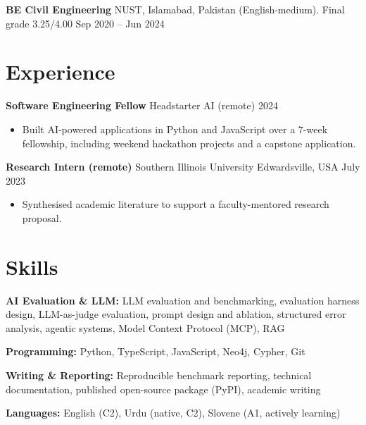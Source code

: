 \documentclass[a4paper,10.5pt]{article}
\newcommand{\datefill}{\dotfill}
\newcommand{\entry}[3]{\vspace{2.5pt}\noindent\textbf{#1} \textbar{} #2 \datefill{} #3\par\vspace{0.5pt}}
\newcommand{\skillrow}[2]{\noindent\textbf{#1:} #2\par\vspace{1pt}}
\begin{document}
\entry{BE Civil Engineering}{NUST, Islamabad, Pakistan (English-medium). Final grade 3.25/4.00}{Sep 2020 -- Jun 2024}

\section{Experience}
\entry{Software Engineering Fellow}{Headstarter AI (remote)}{2024}
\begin{itemize}
  \item Built AI-powered applications in Python and JavaScript over a 7-week fellowship,
        including weekend hackathon projects and a capstone application.
\end{itemize}

\entry{Research Intern (remote)}{Southern Illinois University Edwardsville, USA}{July 2023}
\begin{itemize}
  \item Synthesised academic literature to support a faculty-mentored research proposal.
\end{itemize}

\section{Skills}

\skillrow{AI Evaluation \& LLM}{LLM evaluation and benchmarking, evaluation harness design, LLM-as-judge evaluation, prompt design and ablation, structured error analysis, agentic systems, Model Context Protocol (MCP), RAG}
\skillrow{Programming}{Python, TypeScript, JavaScript, Neo4j, Cypher, Git}
\skillrow{Writing \& Reporting}{Reproducible benchmark reporting, technical documentation, published open-source package (PyPI), academic writing}

\skillrow{Languages}{English (C2), Urdu (native, C2), Slovene (A1, actively learning)}
\end{document}
